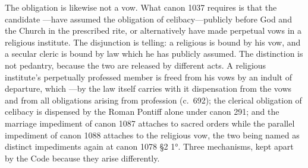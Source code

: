 The obligation is likewise not a vow. What canon 1037 requires is that the candidate ---have assumed the obligation of celibacy---publicly before God and the Church in the prescribed rite, or alternatively have made perpetual vows in a religious institute. The disjunction is telling: a religious is bound by his vow, and a secular cleric is bound by law which he has publicly assumed. The distinction is not pedantry, because the two are released by different acts. A religious institute's perpetually professed member is freed from his vows by an indult of departure, which ---by the law itself carries with it dispensation from the vows and from all obligations arising from profession (c.~692); the clerical obligation of celibacy is dispensed by the Roman Pontiff alone under canon 291; and the marriage impediment of canon 1087 attaches to sacred orders while the parallel impediment of canon 1088 attaches to the religious vow, the two being named as distinct impediments again at canon 1078 §2 1°. Three mechanisms, kept apart by the Code because they arise differently.

